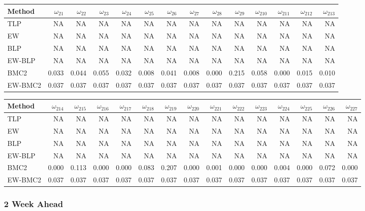 \documentclass[
]{article}
\begin{document}
\begin{tabular}{lrrrrrrrrrrrrr}
\toprule
Method & $\omega_{21}$ & $\omega_{22}$ & $\omega_{23}$ & $\omega_{24}$ & $\omega_{25}$ & $\omega_{26}$ & $\omega_{27}$ & $\omega_{28}$ & $\omega_{29}$ & $\omega_{210}$ & $\omega_{211}$ & $\omega_{212}$ & $\omega_{213}$\\
\midrule
TLP & NA & NA & NA & NA & NA & NA & NA & NA & NA & NA & NA & NA & NA\\
EW & NA & NA & NA & NA & NA & NA & NA & NA & NA & NA & NA & NA & NA\\
BLP & NA & NA & NA & NA & NA & NA & NA & NA & NA & NA & NA & NA & NA\\
EW-BLP & NA & NA & NA & NA & NA & NA & NA & NA & NA & NA & NA & NA & NA\\
BMC2 & 0.033 & 0.044 & 0.055 & 0.032 & 0.008 & 0.041 & 0.008 & 0.000 & 0.215 & 0.058 & 0.000 & 0.015 & 0.010\\
EW-BMC2 & 0.037 & 0.037 & 0.037 & 0.037 & 0.037 & 0.037 & 0.037 & 0.037 & 0.037 & 0.037 & 0.037 & 0.037 & 0.037\\
\bottomrule
\end{tabular}

\begin{tabular}{lrrrrrrrrrrrrrr}
\toprule
Method & $\omega_{214}$ & $\omega_{215}$ & $\omega_{216}$ & $\omega_{217}$ & $\omega_{218}$ & $\omega_{219}$ & $\omega_{220}$ & $\omega_{221}$ & $\omega_{222}$ & $\omega_{223}$ & $\omega_{224}$ & $\omega_{225}$ & $\omega_{226}$ & $\omega_{227}$\\
\midrule
TLP & NA & NA & NA & NA & NA & NA & NA & NA & NA & NA & NA & NA & NA & NA\\
EW & NA & NA & NA & NA & NA & NA & NA & NA & NA & NA & NA & NA & NA & NA\\
BLP & NA & NA & NA & NA & NA & NA & NA & NA & NA & NA & NA & NA & NA & NA\\
EW-BLP & NA & NA & NA & NA & NA & NA & NA & NA & NA & NA & NA & NA & NA & NA\\
BMC2 & 0.000 & 0.113 & 0.000 & 0.000 & 0.083 & 0.207 & 0.000 & 0.001 & 0.000 & 0.000 & 0.004 & 0.000 & 0.072 & 0.000\\
EW-BMC2 & 0.037 & 0.037 & 0.037 & 0.037 & 0.037 & 0.037 & 0.037 & 0.037 & 0.037 & 0.037 & 0.037 & 0.037 & 0.037 & 0.037\\
\bottomrule
\end{tabular}

\hypertarget{week-ahead-13}{%
\subsubsection{2 Week Ahead}\label{week-ahead-13}}
\end{document}
